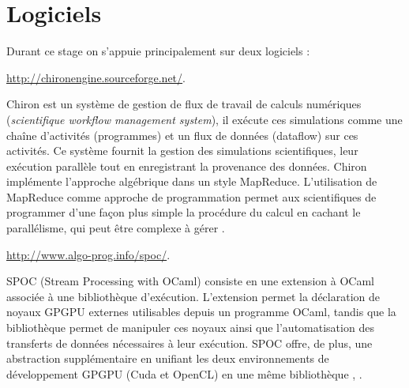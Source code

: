 \chapter{Logiciels}
Durant ce stage on s'appuie principalement sur deux logiciels :
\begin{description}\label{chiron}
\item[Chiron]  \url{http://chironengine.sourceforge.net/}.

Chiron est un système de gestion de flux de travail de calculs numériques (\textit{scientifique workflow management system}),  il exécute ces simulations comme une chaîne d'activités (programmes) et un flux de données (dataflow) sur ces activités. Ce système fournit la gestion des simulations scientifiques, leur exécution parallèle tout en enregistrant la provenance des données. Chiron implémente l'approche algébrique dans un style MapReduce. L'utilisation de MapReduce comme approche de programmation permet aux scientifiques de programmer d'une façon plus simple la procédure du calcul en cachant le parallélisme, qui peut être complexe à gérer \cite{oga13}.


\item[SPOC] \url{http://www.algo-prog.info/spoc/}.

SPOC (Stream Processing with OCaml)  consiste en une extension à OCaml associée à une bibliothèque d'exécution. L'extension permet la déclaration de noyaux GPGPU externes utilisables depuis un programme OCaml, tandis que la bibliothèque permet de manipuler ces noyaux ainsi que l'automatisation des transferts de données nécessaires à leur exécution. SPOC offre, de plus, une abstraction supplémentaire en unifiant les deux environnements de développement GPGPU (Cuda et OpenCL) en une même bibliothèque \cite{bou14}, \cite{bour14}.


\end{description}
\vspace{0.5cm}

\vspace{\parskip}
